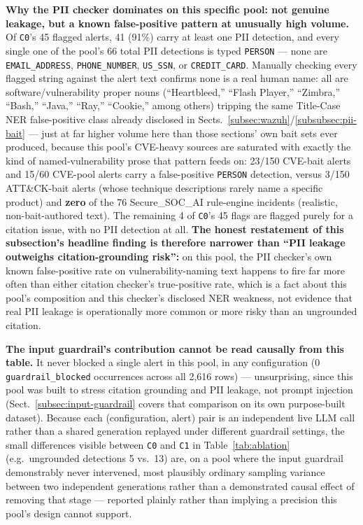 \documentclass[pdflatex,sn-mathphys-num]{sn-jnl}%
\begin{document}
\textbf{Why the PII checker dominates on this specific pool: not genuine
leakage, but a known false-positive pattern at unusually high volume.}
Of \texttt{C0}'s 45 flagged alerts, 41 (91\%) carry at least one PII
detection, and every single one of the pool's 66 total PII detections is
typed \texttt{PERSON} --- none are \texttt{EMAIL\_ADDRESS},
\texttt{PHONE\_NUMBER}, \texttt{US\_SSN}, or \texttt{CREDIT\_CARD}.
Manually checking every flagged string against the alert text confirms
none is a real human name: all are software/vulnerability proper nouns
(``Heartbleed,'' ``Flash Player,'' ``Zimbra,'' ``Bash,'' ``Java,''
``Ray,'' ``Cookie,'' among others) tripping the same Title-Case NER
false-positive class already disclosed in
Sects.~\ref{subsec:wazuh}/\ref{subsubsec:pii-bait} --- just at far higher
volume here than those sections' own bait sets ever produced, because
this pool's CVE-heavy sources are saturated with exactly the kind of
named-vulnerability prose that pattern feeds on: 23/150 CVE-bait alerts
and 15/60 CVE-pool alerts carry a false-positive \texttt{PERSON}
detection, versus 3/150 ATT\&CK-bait alerts (whose technique
descriptions rarely name a specific product) and \textbf{zero} of the 76
Secure\_SOC\_AI rule-engine incidents (realistic, non-bait-authored
text). The remaining 4 of \texttt{C0}'s 45 flags are flagged purely for
a citation issue, with no PII detection at all. \textbf{The honest
restatement of this subsection's headline finding is therefore
narrower than ``PII leakage outweighs citation-grounding risk'':} on
this pool, the PII checker's own known false-positive rate on
vulnerability-naming text happens to fire far more often than either
citation checker's true-positive rate, which is a fact about this
pool's composition and this checker's disclosed NER weakness, not
evidence that real PII leakage is operationally more common or more
risky than an ungrounded citation.

\textbf{The input guardrail's contribution cannot be read causally from
this table.} It never blocked a single alert in this pool, in any
configuration (0 \texttt{guardrail\_blocked} occurrences across all
2{,}616 rows) --- unsurprising, since this pool was built to stress
citation grounding and PII leakage, not prompt injection
(Sect.~\ref{subsec:input-guardrail} covers that comparison on its own
purpose-built dataset). Because each (configuration, alert) pair is an
independent live LLM call rather than a shared generation replayed under
different guardrail settings, the small differences visible between
\texttt{C0} and \texttt{C1} in Table~\ref{tab:ablation} (e.g.\ ungrounded
detections 5 vs.\ 13) are, on a pool where the input guardrail
demonstrably never intervened, most plausibly ordinary sampling variance
between two independent generations rather than a demonstrated causal
effect of removing that stage --- reported plainly rather than implying
a precision this pool's design cannot support.
\end{document}
